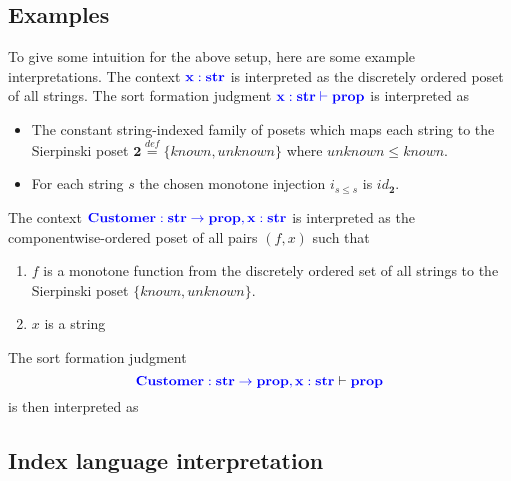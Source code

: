 \documentclass{article}
\newcommand{\blu}[1]{\mathbf{\color{blue}{#1}}}
\newcommand{\mbf}{\mathbf}
\newcommand{\defeq}{\overset{\mathit{def}}{=}}
\begin{document}
\subsection*{Examples}

To give some intuition for the above setup, here are some example interpretations. The context $\blu{x : str}$ is interpreted as the discretely ordered poset of all strings. The sort formation judgment $\blu{x : str \vdash prop}$ is interpreted as 

\begin{itemize}
\item The constant string-indexed family of posets which maps each string to the Sierpinski poset $\mbf{2} \defeq \{ \mathit{known}, \mathit{unknown} \}$ where $\mathit{unknown} \leq \mathit{known}$.
\item For each string $s$ the chosen monotone injection $i_{s \leq s}$ is $\mathit{id}_{\mbf{2}}$.  
\end{itemize}
 
The context $\blu{Customer : str \to prop,x:str}$ is interpreted as the componentwise-ordered poset of all pairs $(f,x)$ such that
\begin{enumerate}
\item $f$ is a monotone function from the discretely ordered set of all strings to the Sierpinski poset $\{ \mathit{known}, \mathit{unknown} \}$.
\item $x$ is a string
\end{enumerate}
The sort formation judgment
$$\blu{Customer : str \to prop,x:str} \vdash \blu{prop}$$ 
is then interpreted as 

\subsection*{Index language interpretation}
\end{document}

